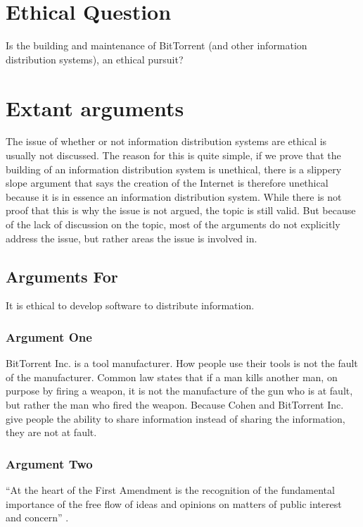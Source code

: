 \documentclass[11pt]{article}
\begin{document}
\section{Ethical Question}

Is the building and maintenance of BitTorrent (and other information distribution systems), an ethical pursuit?

\section{Extant arguments}

The issue of whether or not information distribution systems are ethical is usually not discussed. The reason for this is quite simple, if we prove that the building of an information distribution system is unethical, there is a slippery slope argument that says the creation of the Internet is therefore unethical because it is in essence an information distribution system. While there is not proof that this is why the issue is not argued, the topic is still valid. But because of the lack of discussion on the topic, most of the arguments do not explicitly address the issue, but rather areas the issue is involved in.

\subsection{Arguments For}

It is ethical to develop software to distribute information.

\subsubsection{Argument One}
BitTorrent Inc. is a tool manufacturer. How people use their tools is not the fault of the manufacturer. Common law states that if a man kills another man, on purpose by firing a weapon, it is not the manufacture of the gun who is at fault, but rather the man who fired the weapon. Because Cohen and BitTorrent Inc. give people the ability to share information instead of sharing the information, they are not at fault.

\subsubsection{Argument Two}
``At the heart of the First Amendment is the recognition of the fundamental importance of the free flow of ideas and opinions on matters of public interest and concern'' \cite[51]{1988hustler}.
\end{document}
